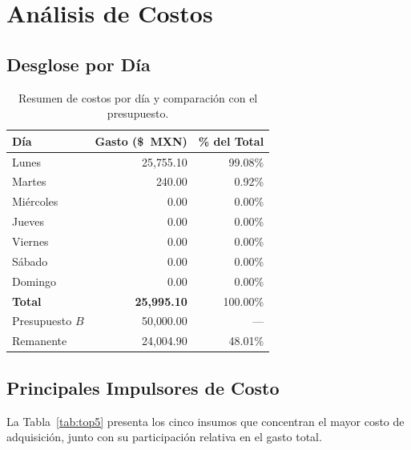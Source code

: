 \documentclass[12pt, a4paper]{article}
\begin{document}
\section{Análisis de Costos}

\subsection{Desglose por Día}

\begin{table}[h!]
\centering
\renewcommand{\arraystretch}{1.3}
\begin{tabular}{lrr}
\toprule
\textbf{Día} & \textbf{Gasto (\$~MXN)} & \textbf{\% del Total} \\
\midrule
Lunes      & 25{,}755.10 & 99.08\% \\
Martes     &     240.00  &  0.92\% \\
Miércoles  &       0.00  &  0.00\% \\
Jueves     &       0.00  &  0.00\% \\
Viernes    &       0.00  &  0.00\% \\
Sábado     &       0.00  &  0.00\% \\
Domingo    &       0.00  &  0.00\% \\
\midrule
\textbf{Total}        & \textbf{25{,}995.10} & 100.00\% \\
Presupuesto $B$       & 50{,}000.00 & --- \\
Remanente             & 24{,}004.90 & 48.01\% \\
\bottomrule
\end{tabular}
\caption{Resumen de costos por día y comparación con el presupuesto.}
\label{tab:costos_dia}
\end{table}

\subsection{Principales Impulsores de Costo}

La Tabla~\ref{tab:top5} presenta los cinco insumos que concentran el mayor costo
de adquisición, junto con su participación relativa en el gasto total.
\end{document}
